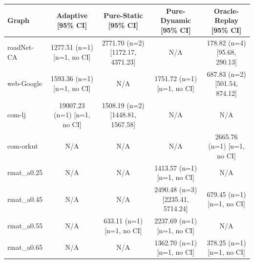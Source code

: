 \begin{tabular}{lcccc}
\hline
Graph & Adaptive [95\% CI] & Pure-Static [95\% CI] & Pure-Dynamic [95\% CI] & Oracle-Replay [95\% CI] \\
\hline
roadNet-CA & 1277.51 (n=1) [n=1, no CI] & 2771.70 (n=2) [1172.17, 4371.23] & N/A & 178.82 (n=4) [95.68, 290.13] \\
web-Google & 1593.36 (n=1) [n=1, no CI] & N/A & 1751.72 (n=1) [n=1, no CI] & 687.83 (n=2) [501.54, 874.12] \\
com-lj & 19007.23 (n=1) [n=1, no CI] & 1508.19 (n=2) [1448.81, 1567.58] & N/A & N/A \\
com-orkut & N/A & N/A & N/A & 2665.76 (n=1) [n=1, no CI] \\
rmat_a0.25 & N/A & N/A & 1413.57 (n=1) [n=1, no CI] & N/A \\
rmat_a0.45 & N/A & N/A & 2490.48 (n=3) [2235.41, 5714.24] & 679.45 (n=1) [n=1, no CI] \\
rmat_a0.55 & N/A & 633.11 (n=1) [n=1, no CI] & 2237.69 (n=1) [n=1, no CI] & N/A \\
rmat_a0.65 & N/A & N/A & 1362.70 (n=1) [n=1, no CI] & 378.25 (n=1) [n=1, no CI] \\
\hline
\end{tabular}

